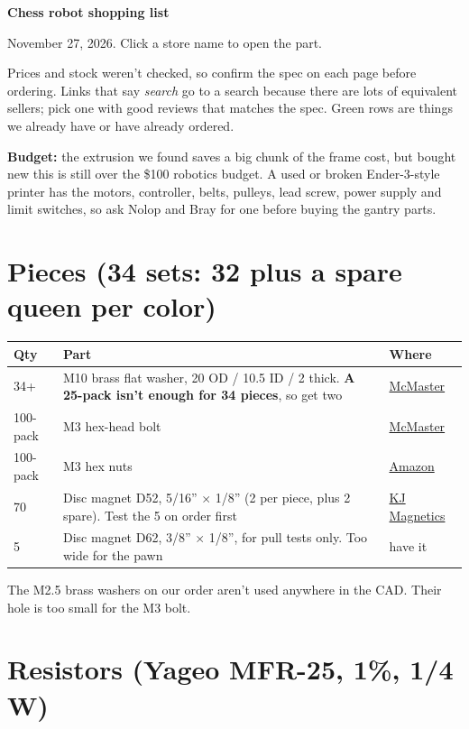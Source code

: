 \documentclass[10pt]{article}
\newcommand{\buy}[4]{#1 & #2 & \href{#4}{#3} \\}
\newcommand{\have}[2]{#1 & #2 & \textcolor{green!45!black}{have it} \\}
\begin{document}
{\LARGE\bfseries Chess robot shopping list}\par
\vspace{0.3em}
{\color{gray}November 27, 2026. Click a store name to open the part.}

Prices and stock weren't checked, so confirm the spec on each page before ordering. Links that
say \emph{search} go to a search because there are lots of equivalent sellers; pick one with
good reviews that matches the spec. \textcolor{green!45!black}{Green} rows are things we already
have or have already ordered.

\textbf{Budget:} the extrusion we found saves a big chunk of the frame cost, but bought new
this is still over the \$100 robotics budget. A used or broken Ender-3-style printer has the
motors, controller, belts, pulleys, lead screw, power supply and limit switches, so ask Nolop
and Bray for one before buying the gantry parts.

\section{Pieces (34 sets: 32 plus a spare queen per color)}

\begin{tabularx}{\textwidth}{l L l}
\toprule
Qty & Part & Where \\
\midrule
\buy{34+}{M10 brass flat washer, 20 OD / 10.5 ID / 2 thick. \textbf{A 25-pack isn't enough for 34 pieces}, so get two}{McMaster}{https://www.mcmaster.com/98691A118/}
\buy{100-pack}{M3 hex-head bolt}{McMaster}{https://www.mcmaster.com/91280A104/}
\buy{100-pack}{M3 hex nuts}{Amazon}{https://www.amazon.com/100Pcs-Stainless-Coarse-Machine-Hardware/dp/B0G352WV29}
\buy{70}{Disc magnet D52, 5/16'' $\times$ 1/8'' (2 per piece, plus 2 spare). Test the 5 on order first}{KJ Magnetics}{https://www.kjmagnetics.com/d52-neodymium-disc-magnet}
\have{5}{Disc magnet D62, 3/8'' $\times$ 1/8'', for pull tests only. Too wide for the pawn}
\bottomrule
\end{tabularx}

The M2.5 brass washers on our order aren't used anywhere in the CAD. Their hole is too small for
the M3 bolt.

\section{Resistors (Yageo MFR-25, 1\%, 1/4 W)}
\end{document}
